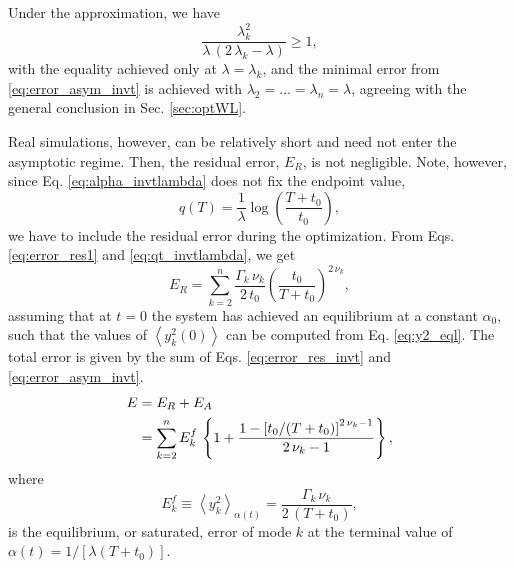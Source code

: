 \documentclass[reprint, floatfix]{revtex4-1}
\newcommand{\Err}{E}
\begin{document}
Under the approximation, we have
$$
\frac{ \lambda_k^2 }{ \lambda \, (2 \, \lambda_k - \lambda) } \ge 1,
$$
with the equality achieved only at $\lambda = \lambda_k$,
and the minimal error from \eqref{eq:error_asym_invt}
is achieved with
$\lambda_2 = \dots = \lambda_n = \lambda$,
agreeing with the general conclusion
in Sec. \ref{sec:optWL}.



Real simulations, however,
can be relatively short
and need not enter
the asymptotic regime.
%
Then, the residual error, $\Err_R$, is not negligible.
%
Note, however,
since Eq. \eqref{eq:alpha_invtlambda}
does not fix the endpoint value,
%
\begin{equation}
q(T) = \frac{ 1 } { \lambda }
\log\left(
  \frac{ T + t_0 } { t_0 }
\right),
\label{eq:qt_invtlambda}
\end{equation}
%
we have to include the residual error
during the optimization.
%
From Eqs. \eqref{eq:error_res1} and \eqref{eq:qt_invtlambda},
we get
%
\begin{equation}
\Err_R
=
\sum_{k = 2}^n
  \frac{ \Gamma_k \, \nu_k }
       {        2 \, t_0   }
  \left(
      \frac{   t_0   }
           { T + t_0 }
   \right)^{ 2 \, \nu_k },
\label{eq:error_res_invt}
\end{equation}
%
assuming that at $t = 0$
the system has achieved an equilibrium
at a constant $\alpha_0$,
such that the values of
$\left\langle y_k^2(0) \right\rangle$
can be computed from Eq. \eqref{eq:y2_eql}.
%
The total error is given by the sum of
Eqs. \eqref{eq:error_res_invt} and \eqref{eq:error_asym_invt}.
%
\begin{align}
\Err
&=
\Err_R + \Err_A
\notag
\\
&=
\sum_{ k = 2 }^n
  \Err^f_k \,
  \left\{
    1
    +
    \frac{ 1 - \left[ t_0 / (T + t_0) \right]^{2 \, \nu_k - 1} }
         {                 2 \, \nu_k - 1                      }
  \right\}
,
\label{eq:error_invt}
\end{align}
%
where
$$
\Err^f_k
\equiv
\left\langle
  y_k^2
\right\rangle_{ \alpha(t) }
=
\frac{  \Gamma_k \, \nu_k   }
     {    2 \, (T + t_0)    }
,
$$
is the equilibrium, or saturated, error of mode $k$
at the terminal value
of $\alpha(t) = 1/[\lambda (T + t_0)]$.
\end{document}

